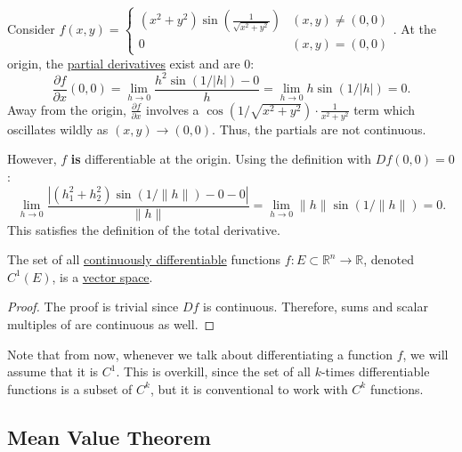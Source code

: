	\begin{example}
	  \label{ex:non-continuous-partials-and-differentiable}
		Consider $f(x, y) = \begin{cases} (x^2 + y^2) \sin\left(\frac{1}{\sqrt{x^2 + y^2}}\right) & (x, y) \neq (0, 0) \\ 0 & (x, y) = (0, 0) \end{cases}$.
		At the origin, the \hyperref[def:partial-derivative]{partial derivatives} exist and are 0:
		\begin{equation}
		  \frac{\partial f}{\partial x}(0,0) = \lim_{h \to 0} \frac{h^2 \sin(1/|h|) - 0}{h} = \lim_{h \to 0} h \sin(1/|h|) = 0.
		\end{equation}
		Away from the origin, $\frac{\partial f}{\partial x}$ involves a $\cos(1/\sqrt{x^2+y^2}) \cdot \frac{1}{x^2+y^2}$ term which oscillates wildly as $(x, y) \to (0, 0)$. Thus, the partials are not continuous. 
		
		However, $f$ \textbf{is} differentiable at the origin. Using the definition with $Df(0,0) = 0$:
		\begin{equation}
		  \lim_{h \to 0} \frac{|(h_1^2 + h_2^2) \sin(1/\|h\|) - 0 - 0|}{\|h\|} = \lim_{h \to 0} \|h\| \sin(1/\|h\|) = 0.
		\end{equation}
		This satisfies the definition of the total derivative.
	\end{example}

  \begin{theorem}[$C^1$ Space]
    \label{thm:c1-space}
		The set of all \hyperref[def:continuously-differentiable]{continuously differentiable} functions $f: E \subset \mathbb{R}^n \to \mathbb{R}$, denoted $C^1 (E)$, is a \hyperref[lin-def:vector-space]{vector space}. 
  \end{theorem}
	\begin{proof}
	  The proof is trivial since $Df$ is continuous. Therefore, sums and scalar multiples of are continuous as well. 
	\end{proof}

	Note that from now, whenever we talk about differentiating a function $f$, we will assume that it is $C^1$. This is overkill, since the set of all $k$-times differentiable functions is a subset of $C^k$, but it is conventional to work with $C^k$ functions.  

\subsection{Mean Value Theorem}

